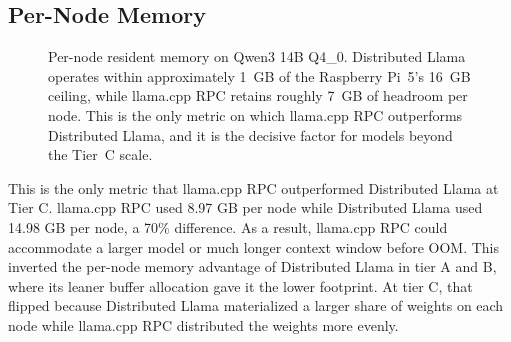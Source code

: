 \subsection{Per-Node Memory}
\begin{figure}[htbp]
  \centering
  \caption{Per-node resident memory on Qwen3 14B Q4\_0. Distributed Llama operates within approximately 1~GB of the Raspberry Pi~5's 16~GB ceiling, while llama.cpp RPC retains roughly 7~GB of headroom per node. This is the only metric on which llama.cpp RPC outperforms Distributed Llama, and it is the decisive factor for models beyond the Tier~C scale.}
  \label{fig:rq3-memory}
\end{figure}

This is the only metric that llama.cpp RPC outperformed Distributed Llama at Tier C. llama.cpp RPC used 8.97 GB per node while Distributed Llama used 14.98 GB per node, a 70\% difference. As a result, llama.cpp RPC could accommodate a larger model or much longer context window before OOM. This inverted the per-node memory advantage of Distributed Llama in tier A and B, where its leaner buffer allocation gave it the lower footprint. At tier C, that flipped because Distributed Llama materialized a larger share of weights on each node while llama.cpp RPC distributed the weights more evenly.
